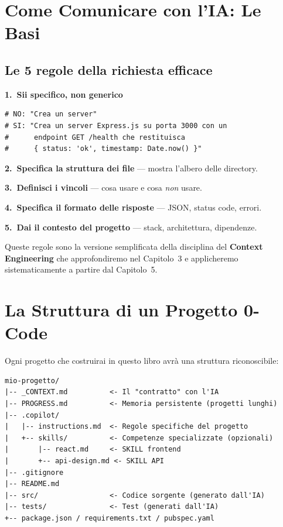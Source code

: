 \section{Come Comunicare con l'IA: Le Basi}

\subsection{Le 5 regole della richiesta efficace}

\textbf{1.\ Sii specifico, non generico}
\begin{lstlisting}
# NO: "Crea un server"
# SI: "Crea un server Express.js su porta 3000 con un
#      endpoint GET /health che restituisca
#      { status: 'ok', timestamp: Date.now() }"
\end{lstlisting}

\textbf{2.\ Specifica la struttura dei file} --- mostra l'albero delle directory.

\textbf{3.\ Definisci i vincoli} --- cosa usare e cosa \textit{non} usare.

\textbf{4.\ Specifica il formato delle risposte} --- JSON, status code, errori.

\textbf{5.\ Dai il contesto del progetto} --- stack, architettura, dipendenze.

\begin{notebox}
Queste regole sono la versione semplificata della disciplina del \textbf{Context Engineering} che approfondiremo nel Capitolo~3 e applicheremo sistematicamente a partire dal Capitolo~5.
\end{notebox}

\section{La Struttura di un Progetto 0-Code}

Ogni progetto che costruirai in questo libro avrà una struttura riconoscibile:

\begin{lstlisting}
mio-progetto/
|-- _CONTEXT.md          <- Il "contratto" con l'IA
|-- PROGRESS.md          <- Memoria persistente (progetti lunghi)
|-- .copilot/
|   |-- instructions.md  <- Regole specifiche del progetto
|   +-- skills/          <- Competenze specializzate (opzionali)
|       |-- react.md     <- SKILL frontend
|       +-- api-design.md <- SKILL API
|-- .gitignore
|-- README.md
|-- src/                 <- Codice sorgente (generato dall'IA)
|-- tests/               <- Test (generati dall'IA)
+-- package.json / requirements.txt / pubspec.yaml
\end{lstlisting}

